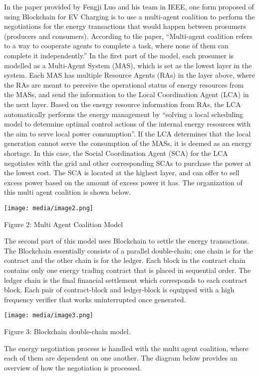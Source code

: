 \documentclass[
]{article}
\begin{document}
In the paper provided by Fengji Luo and his team in IEEE, one form
proposed of using Blockchain for EV Charging is to use a multi-agent
coalition to perform the negotiations for the energy transactions that
would happen between prosumers (producers and consumers). According to
the paper, ``Multi-agent coalition refers to a way to cooperate agents
to complete a task, where none of them can complete it independently.''
In the first part of the model, each prosumer is modelled as a
Multi-Agent System (MAS), which is set as the lowest layer in the
system. Each MAS has multiple Resource Agents (RAs) in the layer above,
where the RAs are meant to perceive the operational status of energy
resources from the MASs, and send the information to the Local
Coordination Agent (LCA) in the next layer. Based on the energy resource
information from RAs, the LCA automatically performs the energy
management by ``solving a local scheduling model to determine optimal
control actions of the internal energy resources with the aim to serve
local power consumption''. If the LCA determines that the local
generation cannot serve the consumption of the MASs, it is deemed as an
energy shortage. In this case, the Social Coordination Agent (SCA) for
the LCA negotiates with the grid and other corresponding SCAs to
purchase the power at the lowest cost. The SCA is located at the highest
layer, and can offer to sell excess power based on the amount of excess
power it has. The organization of this multi agent coalition is shown
below.

\texttt{[image: media/image2.png]}

Figure 2: Multi Agent Coalition Model

The second part of this model uses Blockchain to settle the energy
transactions. The Blockchain essentially consists of a parallel
double-chain; one chain is for the contract and the other chain is for
the ledger. Each block in the contract chain contains only one energy
trading contract that is placed in sequential order. The ledger chain is
the final financial settlement which corresponds to each contract block.
Each pair of contract-block and ledger-block is equipped with a high
frequency verifier that works uninterrupted once generated.

\texttt{[image: media/image3.png]}

Figure 3: Blockchain double-chain model.

The energy negotiation process is handled with the multi agent
coalition, where each of them are dependent on one another. The diagram
below provides an overview of how the negotiation is processed.
\end{document}
